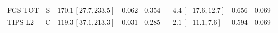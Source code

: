 \begin{longtable}{lcp{37mm}rrp{37mm}rr}
FGS-TOT & S & \(170.1\,[27.7,233.5]\) & 0.062 & 0.354 & \(-4.4\,[-17.6,12.7]\) & 0.656 & 0.069\\
TIPS-L2 & C & \(119.3\,[37.1,213.3]\) & 0.031 & 0.285 & \(-2.1\,[-11.1,7.6]\) & 0.594 & 0.069\\

\end{longtable}
